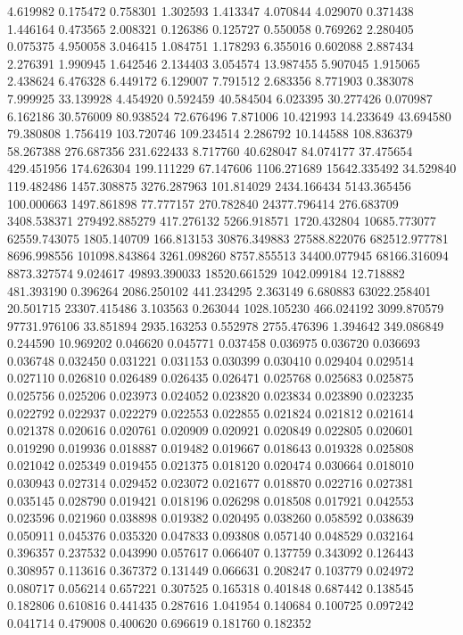 4.619982
0.175472
0.758301
1.302593
1.413347
4.070844
4.029070
0.371438
1.446164
0.473565
2.008321
0.126386
0.125727
0.550058
0.769262
2.280405
0.075375
4.950058
3.046415
1.084751
1.178293
6.355016
0.602088
2.887434
2.276391
1.990945
1.642546
2.134403
3.054574
13.987455
5.907045
1.915065
2.438624
6.476328
6.449172
6.129007
7.791512
2.683356
8.771903
0.383078
7.999925
33.139928
4.454920
0.592459
40.584504
6.023395
30.277426
0.070987
6.162186
30.576009
80.938524
72.676496
7.871006
10.421993
14.233649
43.694580
79.380808
1.756419
103.720746
109.234514
2.286792
10.144588
108.836379
58.267388
276.687356
231.622433
8.717760
40.628047
84.074177
37.475654
429.451956
174.626304
199.111229
67.147606
1106.271689
15642.335492
34.529840
119.482486
1457.308875
3276.287963
101.814029
2434.166434
5143.365456
100.000663
1497.861898
77.777157
270.782840
24377.796414
276.683709
3408.538371
279492.885279
417.276132
5266.918571
1720.432804
10685.773077
62559.743075
1805.140709
166.813153
30876.349883
27588.822076
682512.977781
8696.998556
101098.843864
3261.098260
8757.855513
34400.077945
68166.316094
8873.327574
9.024617
49893.390033
18520.661529
1042.099184
12.718882
481.393190
0.396264
2086.250102
441.234295
2.363149
6.680883
63022.258401
20.501715
23307.415486
3.103563
0.263044
1028.105230
466.024192
3099.870579
97731.976106
33.851894
2935.163253
0.552978
2755.476396
1.394642
349.086849
0.244590
10.969202
0.046620
0.045771
0.037458
0.036975
0.036720
0.036693
0.036748
0.032450
0.031221
0.031153
0.030399
0.030410
0.029404
0.029514
0.027110
0.026810
0.026489
0.026435
0.026471
0.025768
0.025683
0.025875
0.025756
0.025206
0.023973
0.024052
0.023820
0.023834
0.023890
0.023235
0.022792
0.022937
0.022279
0.022553
0.022855
0.021824
0.021812
0.021614
0.021378
0.020616
0.020761
0.020909
0.020921
0.020849
0.022805
0.020601
0.019290
0.019936
0.018887
0.019482
0.019667
0.018643
0.019328
0.025808
0.021042
0.025349
0.019455
0.021375
0.018120
0.020474
0.030664
0.018010
0.030943
0.027314
0.029452
0.023072
0.021677
0.018870
0.022716
0.027381
0.035145
0.028790
0.019421
0.018196
0.026298
0.018508
0.017921
0.042553
0.023596
0.021960
0.038898
0.019382
0.020495
0.038260
0.058592
0.038639
0.050911
0.045376
0.035320
0.047833
0.093808
0.057140
0.048529
0.032164
0.396357
0.237532
0.043990
0.057617
0.066407
0.137759
0.343092
0.126443
0.308957
0.113616
0.367372
0.131449
0.066631
0.208247
0.103779
0.024972
0.080717
0.056214
0.657221
0.307525
0.165318
0.401848
0.687442
0.138545
0.182806
0.610816
0.441435
0.287616
1.041954
0.140684
0.100725
0.097242
0.041714
0.479008
0.400620
0.696619
0.181760
0.182352
